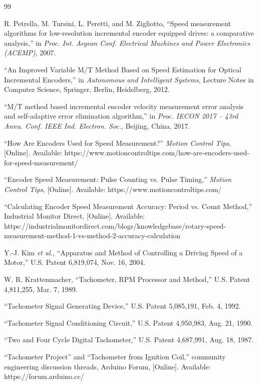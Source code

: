 \documentclass[journal, twocolumn]{IEEEtran}
\begin{document}
\begin{thebibliography}{99}

R. Petrella, M. Tursini, L. Peretti, and M. Zigliotto, ``Speed measurement algorithms for low-resolution incremental encoder equipped drives: a comparative analysis,'' in \emph{Proc. Int. Aegean Conf. Electrical Machines and Power Electronics (ACEMP)}, 2007.

``An Improved Variable M/T Method Based on Speed Estimation for Optical Incremental Encoders,'' in \emph{Autonomous and Intelligent Systems}, Lecture Notes in Computer Science, Springer, Berlin, Heidelberg, 2012.

``M/T method based incremental encoder velocity measurement error analysis and self-adaptive error elimination algorithm,'' in \emph{Proc. IECON 2017 -- 43rd Annu. Conf. IEEE Ind. Electron. Soc.}, Beijing, China, 2017.

``How Are Encoders Used for Speed Measurement?'' \emph{Motion Control Tips}, [Online]. Available: https://www.motioncontroltips.com/how-are-encoders-used-for-speed-measurement/

``Encoder Speed Measurement: Pulse Counting vs. Pulse Timing,'' \emph{Motion Control Tips}, [Online]. Available: https://www.motioncontroltips.com/

``Calculating Encoder Speed Measurement Accuracy: Period vs. Count Method,'' Industrial Monitor Direct, [Online]. Available: https://industrialmonitordirect.com/blogs/knowledgebase/rotary-speed-measurement-method-1-vs-method-2-accuracy-calculation

Y.-J. Kim \emph{et al.}, ``Apparatus and Method of Controlling a Driving Speed of a Motor,'' U.S. Patent 6,819,074, Nov. 16, 2004.

W. R. Krattenmacher, ``Tachometer, RPM Processor and Method,'' U.S. Patent 4,811,255, Mar. 7, 1989.

``Tachometer Signal Generating Device,'' U.S. Patent 5,085,191, Feb. 4, 1992.

``Tachometer Signal Conditioning Circuit,'' U.S. Patent 4,950,983, Aug. 21, 1990.

``Two and Four Cycle Digital Tachometer,'' U.S. Patent 4,687,991, Aug. 18, 1987.

``Tachometer Project'' and ``Tachometer from Ignition Coil,'' community engineering discussion threads, Arduino Forum, [Online]. Available: https://forum.arduino.cc/


\end{thebibliography}
\end{document}
